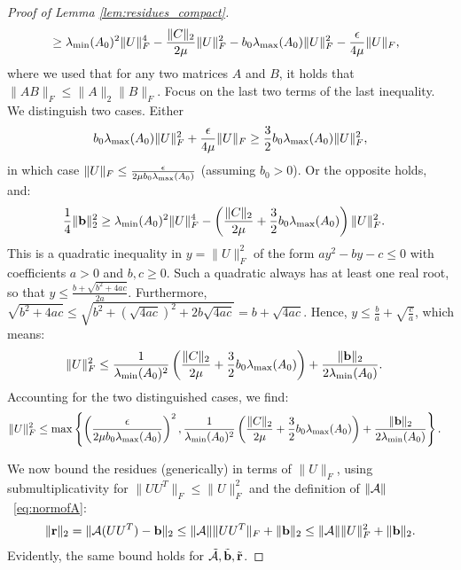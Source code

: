 \begin{proof}[Proof of Lemma \ref{lem:residues_compact}]
\begin{align*}
	& \geq \lambda_{\min}(A_0)^2 \|U\|_F^4 -\frac{\|C\|_2}{2\mu}\|U\|_F^2 - b_0 \lambda_{\max}(A_0) \|U\|_F^2 - \frac{\epsilon}{4\mu}\|U\|_F,
	\end{align*}
	where we used that for any two matrices $A$ and $B$, it holds that $\|AB\|_F \leq \|A\|_2 \|B\|_F$.
	Focus on the last two terms of the last inequality. We distinguish two cases. Either
	\begin{align*}
		b_0 \lambda_{\max}(A_0) \|U\|_F^2 + \frac{\epsilon}{4\mu}\|U\|_F \geq  \frac{3}{2}b_0 \lambda_{\max}(A_0)\|U\|_F^2,
	\end{align*}
	in which case $\|U\|_F \leq \frac{\epsilon}{2\mu b_0 \lambda_{\max}(A_0)}$ (assuming $b_0 > 0$). Or the opposite holds, and:
	\begin{align*}
		\frac{1}{4} \|\mathbf{b}\|_2^2 & \geq \lambda_{\min}(A_0)^2 \|U\|_F^4 - \left(\frac{\|C\|_2}{2\mu} + \frac{3}{2}b_0 \lambda_{\max}(A_0)\right)\|U\|_F^2.
	\end{align*}
	This is a quadratic inequality in $y = \|U\|_F^2$ of the form $ay^2 - by - c \leq 0$ with coefficients $a> 0$ and $b, c \geq 0$. Such a quadratic always has at least one real root, so that $y \leq \frac{b + \sqrt{b^2 + 4ac}}{2a}$. Furthermore, $\sqrt{b^2 + 4ac} \leq \sqrt{b^2 + (\sqrt{4ac})^2 + 2b\sqrt{4ac}} = b + \sqrt{4ac}$. Hence, $y \leq \frac{b}{a} + \sqrt{\frac{c}{a}}$, which means:
	\begin{align*}
		\|U\|_F^2 & \leq \frac{1}{\lambda_{\min}(A_0)^2} \left(\frac{\|C\|_2}{2\mu} + \frac{3}{2}b_0 \lambda_{\max}(A_0)\right) + \frac{\|\mathbf{b}\|_2}{2\lambda_{\min}(A_0)}.
	\end{align*}
	Accounting for the two distinguished cases, we find:
	\begin{align*}
		\|U\|_F^2 & \leq \max\left\{ \left(\frac{\epsilon}{2\mu b_0 \lambda_{\max}(A_0)}\right)^2, \frac{1}{\lambda_{\min}(A_0)^2} \left(\frac{\|C\|_2}{2\mu} + \frac{3}{2}b_0 \lambda_{\max}(A_0)\right) + \frac{\|\mathbf{b}\|_2}{2\lambda_{\min}(A_0)} \right\}.
	\end{align*}
	
	We now bound the residues (generically) in terms of $\|U\|_F$, using submultiplicativity for $\|UU^T\|_F \leq \|U\|_F^2$ and the definition of $\|\mathcal{A}\|$~\eqref{eq:normofA}:
	\begin{align*}
		\|\mathbf{r}\|_2 = \| \mathcal{A}(UU^T) - \mathbf{b} \|_2 \leq \|\mathcal{A}\| \|UU^T\|_F  + \|\mathbf{b}\|_2 \leq \|\mathcal{A}\| \|U\|_F^2 + \|\mathbf{b}\|_2.
	\end{align*}
	Evidently, the same bound holds for $\tilde{\mathcal{A}}, \tilde {\mathbf{b}}, \tilde {\mathbf{r}}$.
\end{proof}

